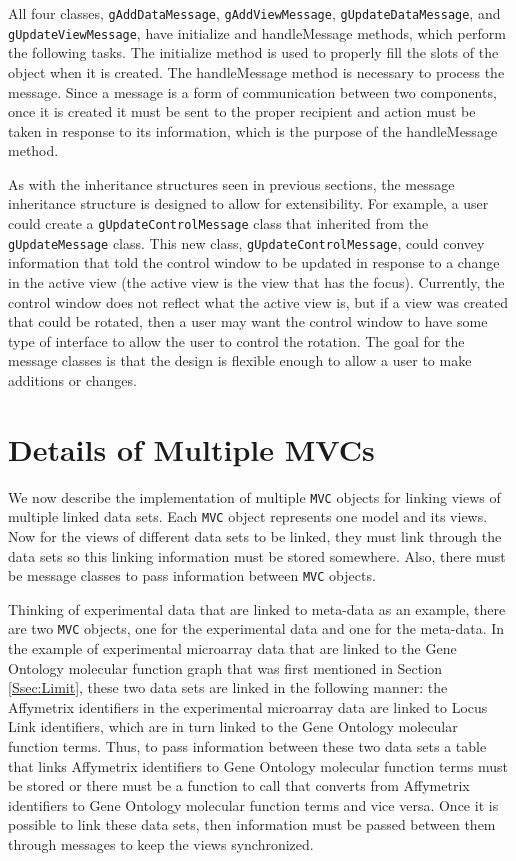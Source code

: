 \documentclass{article}[11pt]
\newcommand{\Rfunction}[1]{{\textsf{#1}}}
\newcommand{\Robject}[1]{{\texttt{#1}}}
\newcommand{\Rclass}[1]{\texttt{#1}}
\begin{document}
All four classes, \Rclass{gAddDataMessage}, \Rclass{gAddViewMessage},
\Rclass{gUpdateDataMessage}, and \Rclass{gUpdateViewMessage}, have
\Rfunction{initialize} and \Rfunction{handleMessage} methods, which perform
the following tasks.  The \Rfunction{initialize} method is used to properly
fill the slots of the object when it is created.  The
\Rfunction{handleMessage} method is necessary to process the message.  Since a
message is a form of communication between two components, once it is created
it must be sent to the proper recipient and action must be taken in response
to its information, which is the purpose of the \Rfunction{handleMessage}
method. 

As with the inheritance structures seen in previous sections, the message
inheritance structure is designed to allow for extensibility.  For example, a
user could create a \Rclass{gUpdateControlMessage} class that inherited from
the \Rclass{gUpdateMessage} class.  This new class,
\Rclass{gUpdateControlMessage}, could convey information that told the
control window to be updated in response to a change in the active view (the
active view is the view that has the focus).  Currently, the control window
does not reflect what the active view is, but if a view was created that could
be rotated, then a user may want the control window to have some type of
interface to allow the user to control the rotation.  The goal for the message
classes is that the design is flexible enough to allow a user to make
additions or changes. 

\section{Details of Multiple MVCs}\label{Sec:MultMVC}

We now describe the implementation of multiple \Robject{MVC} objects for
linking views of multiple linked data sets.  Each \Robject{MVC} object
represents one model and its views.  Now for the
views of different data sets to be linked, they must link through
the data sets so this linking information must be stored somewhere.  Also,
there must be message classes to pass information between
\Robject{MVC} objects. 

Thinking of experimental data that are linked to meta-data as an example, there
are two \Robject{MVC} objects, one for the experimental data and one for the
meta-data.  In the example of experimental microarray data that are linked to
the Gene Ontology molecular function graph that was first mentioned in Section
\ref{Ssec:Limit}, these two data sets are linked in the following manner: the
Affymetrix identifiers in the experimental microarray data are linked to Locus
Link identifiers, which are in turn linked to the Gene Ontology molecular
function terms.  Thus, to pass information between these two data sets a table
that links Affymetrix identifiers to Gene Ontology molecular function terms
must be stored or there must be a function to call that converts from
Affymetrix identifiers to Gene Ontology molecular function terms and vice
versa.  Once it is possible to link these data sets, then information must be
passed between them through messages to keep the views synchronized.
\end{document}
